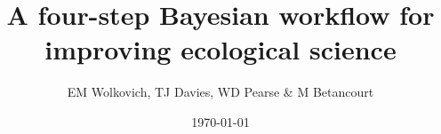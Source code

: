 \documentclass[11pt]{article}
\begin{document}

\renewcommand{\refname}{\CHead{}}


\title{A four-step Bayesian workflow for improving ecological science}
\date{\today}
\author{EM Wolkovich, TJ Davies, WD Pearse \& M Betancourt}
\maketitle

\end{document}
